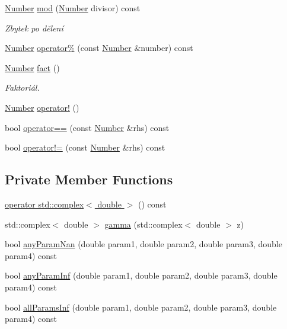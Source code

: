 \begin{DoxyCompactItemize}
\hyperlink{classteam22_1_1_math_1_1_number}{Number} \hyperlink{classteam22_1_1_math_1_1_number_a5e459d8c04e890961a71133eb53a15a9}{mod} (\hyperlink{classteam22_1_1_math_1_1_number}{Number} divisor) const
\begin{DoxyCompactList}\small\item\em Zbytek po dělení \end{DoxyCompactList}\item 
\hyperlink{classteam22_1_1_math_1_1_number}{Number} \hyperlink{classteam22_1_1_math_1_1_number_af635db4c3ad5c6818213472478a9a340}{operator\%} (const \hyperlink{classteam22_1_1_math_1_1_number}{Number} \&number) const
\item 
\hyperlink{classteam22_1_1_math_1_1_number}{Number} \hyperlink{classteam22_1_1_math_1_1_number_a79482f9f91cefb9a617e463313f4269f}{fact} ()
\begin{DoxyCompactList}\small\item\em Faktoriál. \end{DoxyCompactList}\item 
\hyperlink{classteam22_1_1_math_1_1_number}{Number} \hyperlink{classteam22_1_1_math_1_1_number_a93e5b0fdb56c604e76fa5dd28751f443}{operator!} ()
\item 
bool \hyperlink{classteam22_1_1_math_1_1_number_a91aafaa2aa878c94155e364488c56e63}{operator==} (const \hyperlink{classteam22_1_1_math_1_1_number}{Number} \&rhs) const
\item 
bool \hyperlink{classteam22_1_1_math_1_1_number_a3254778b239c52df6b311615f2cd0ad5}{operator!=} (const \hyperlink{classteam22_1_1_math_1_1_number}{Number} \&rhs) const
\end{DoxyCompactItemize}
\subsection*{Private Member Functions}
\begin{DoxyCompactItemize}
\item 
\hyperlink{classteam22_1_1_math_1_1_number_a8b38859209abab3a0a31cad9547fc77c}{operator std\+::complex$<$ double $>$} () const
\item 
std\+::complex$<$ double $>$ \hyperlink{classteam22_1_1_math_1_1_number_a614bd9dccd61f74ca50b54ebf6626ff4}{gamma} (std\+::complex$<$ double $>$ z)
\item 
bool \hyperlink{classteam22_1_1_math_1_1_number_a689b79b83d633155ac15465523634d63}{any\+Param\+Nan} (double param1, double param2, double param3, double param4) const
\item 
bool \hyperlink{classteam22_1_1_math_1_1_number_a98630956cc596c65f97ad0f24b500168}{any\+Param\+Inf} (double param1, double param2, double param3, double param4) const
\item 
bool \hyperlink{classteam22_1_1_math_1_1_number_a55293adfd56de1cac35d12878062e107}{all\+Params\+Inf} (double param1, double param2, double param3, double param4) const
\end{DoxyCompactItemize}

